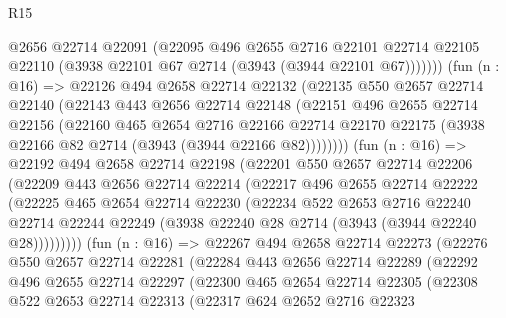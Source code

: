 \begin{lexlean}{R15}
\begin{coremodule}
              @2656
              @22714
              @22091
              (@22095
                @496
                @2655
                @2716
                @22101
                @22714
                @22105
                @22110
                (@3938 @22101 @67 @2714 (@3943 (@3944 @22101 @67)))))))
        (fun (n : @16) =>
        @22126
          @494
          @2658
          @22714
          @22132
          (@22135
            @550
            @2657
            @22714
            @22140
            (@22143
              @443
              @2656
              @22714
              @22148
              (@22151
                @496
                @2655
                @22714
                @22156
                (@22160
                  @465
                  @2654
                  @2716
                  @22166
                  @22714
                  @22170
                  @22175
                  (@3938 @22166 @82 @2714 (@3943 (@3944 @22166 @82))))))))
        (fun (n : @16) =>
        @22192
          @494
          @2658
          @22714
          @22198
          (@22201
            @550
            @2657
            @22714
            @22206
            (@22209
              @443
              @2656
              @22714
              @22214
              (@22217
                @496
                @2655
                @22714
                @22222
                (@22225
                  @465
                  @2654
                  @22714
                  @22230
                  (@22234
                    @522
                    @2653
                    @2716
                    @22240
                    @22714
                    @22244
                    @22249
                    (@3938 @22240 @28 @2714 (@3943 (@3944 @22240 @28)))))))))
        (fun (n : @16) =>
        @22267
          @494
          @2658
          @22714
          @22273
          (@22276
            @550
            @2657
            @22714
            @22281
            (@22284
              @443
              @2656
              @22714
              @22289
              (@22292
                @496
                @2655
                @22714
                @22297
                (@22300
                  @465
                  @2654
                  @22714
                  @22305
                  (@22308
                    @522
                    @2653
                    @22714
                    @22313
                    (@22317
                      @624
                      @2652
                      @2716
                      @22323

\end{coremodule}
\end{lexlean}

